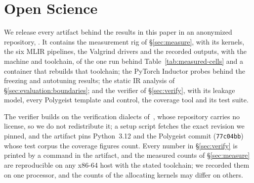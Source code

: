 \section*{Open Science}

We release every artifact behind the results in this paper in an anonymized repository, .
It contains the measurement rig of \S\ref{sec:measure}, with its kernels, the six MLIR pipelines, the Valgrind drivers and the recorded outputs, with the machine and toolchain, of the one run behind Table~\ref{tab:measured-cells} and a container that rebuilds that toolchain; the PyTorch Inductor probes behind the freezing and autotuning results; the static IR analysis of \S\ref{sec:evaluation:boundaries}; and the verifier of \S\ref{sec:verify}, with its leakage model, every Polygeist template and control, the coverage tool and its test suite.

The verifier builds on the verification dialects of~\cite{fcvd2025}, whose repository carries no license, so we do not redistribute it; a setup script fetches the exact revision we pinned, and the artifact pins Python~3.12 and the Polygeist commit (\texttt{77c04bb}) whose test corpus the coverage figures count.
Every number in \S\ref{sec:verify} is printed by a command in the artifact, and the measured counts of \S\ref{sec:measure} are reproducible on any x86-64 host with the stated toolchain; we recorded them on one processor, and the counts of the allocating kernels may differ on others.
